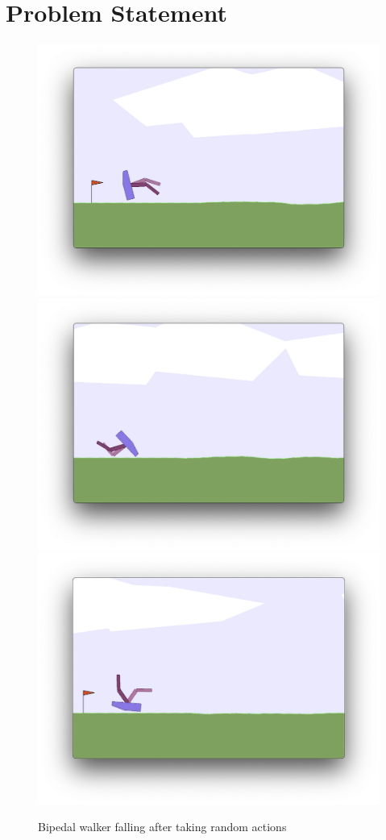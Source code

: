 \documentclass{article}
\begin{document}
\section{Problem Statement}
\label{sec:problem}

\begin{figure}[h]
\caption{Bipedal walker falling after taking random actions}
\centering
\includegraphics[scale=0.25]{images/bipedal-fall-backward.png}
\includegraphics[scale=0.25]{images/bipedal-fall-forward.png}
\includegraphics[scale=0.25]{images/bipedal-fall-upside-down.png}

\end{figure}
\end{document}
